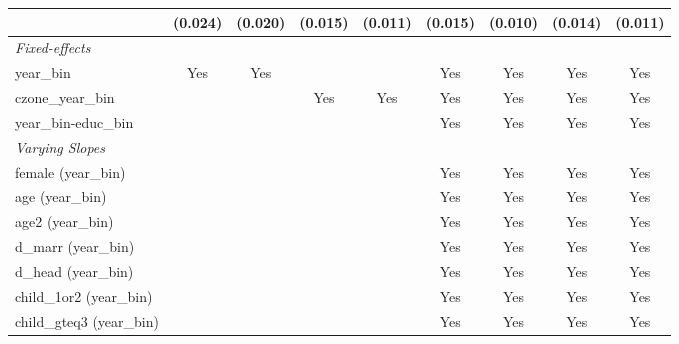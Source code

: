 \begin{tabular}{lcccccccc}
                                           & (0.024)       & (0.020)               & (0.015)       & (0.011)               & (0.015)       & (0.010)               & (0.014)       & (0.011)\\   
   \midrule
   \emph{Fixed-effects}\\
   year\_bin                               & Yes           & Yes                   &               &                       & Yes           & Yes                   & Yes           & Yes\\  
   czone\_year\_bin                        &               &                       & Yes           & Yes                   & Yes           & Yes                   & Yes           & Yes\\  
   year\_bin-educ\_bin                     &               &                       &               &                       & Yes           & Yes                   & Yes           & Yes\\  
   \midrule
   \emph{Varying Slopes}\\
   female (year\_bin)                      &               &                       &               &                       & Yes           & Yes                   & Yes           & Yes\\  
   age (year\_bin)                         &               &                       &               &                       & Yes           & Yes                   & Yes           & Yes\\  
   age2 (year\_bin)                        &               &                       &               &                       & Yes           & Yes                   & Yes           & Yes\\  
   d\_marr (year\_bin)                     &               &                       &               &                       & Yes           & Yes                   & Yes           & Yes\\  
   d\_head (year\_bin)                     &               &                       &               &                       & Yes           & Yes                   & Yes           & Yes\\  
   child\_1or2 (year\_bin)                 &               &                       &               &                       & Yes           & Yes                   & Yes           & Yes\\  
   child\_gteq3 (year\_bin)                &               &                       &               &                       & Yes           & Yes                   & Yes           & Yes\\  

\end{tabular}
